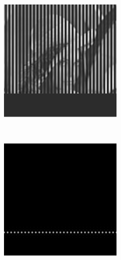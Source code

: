 \begin{figure}[h]
  \centering
  \begin{subfigure}[t]{0.23\textwidth}
      \centering
      \includegraphics[width=\textwidth]{msim_slit/single_progress}
      \caption{}
  \end{subfigure}~
  \begin{subfigure}[t]{0.23\textwidth}
      \centering
      \includegraphics[width=\textwidth]{msim_slit/single_illumination_contrast}

\end{subfigure}
\end{figure}
